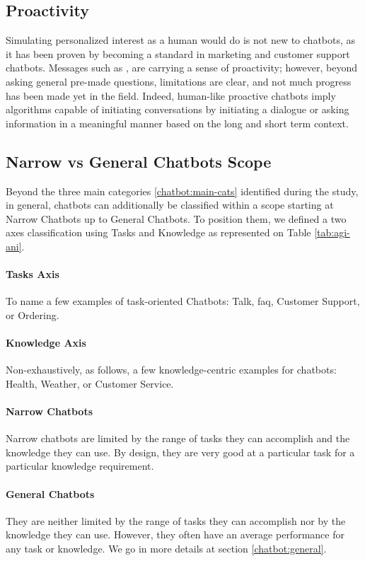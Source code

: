 \subsection{Proactivity}
Simulating personalized interest as a human would do is not new to chatbots, as it has been proven by becoming a standard in marketing and customer support chatbots. Messages such as , are carrying a sense of proactivity; however, beyond asking general pre-made questions, limitations are clear, and not much progress has been made yet in the field. Indeed, human-like proactive chatbots imply algorithms capable of initiating conversations by initiating a dialogue or asking information in a meaningful manner based on the long and short term context.

\subsection{Narrow vs General Chatbots Scope}
Beyond the three main categories \ref{chatbot:main-cats} identified during the study, in general, chatbots can additionally be classified within a scope starting at Narrow Chatbots up to General Chatbots. To position them, we defined a two axes classification using Tasks and Knowledge as represented on Table \ref{tab:agi-ani}.

\paragraph{Tasks Axis}
To name a few examples of task-oriented Chatbots: Talk, \gls{faq}, Customer Support, or Ordering.

\paragraph{Knowledge Axis}
Non-exhaustively, as follows, a few knowledge-centric examples for chatbots: Health, Weather, or Customer Service.

\paragraph{Narrow Chatbots}
Narrow chatbots are limited by the range of tasks they can accomplish and the knowledge they can use. By design, they are very good at a particular task for a particular knowledge requirement.

\paragraph{General Chatbots}
They are neither limited by the range of tasks they can accomplish nor by the knowledge they can use. However, they often have an average performance for any task or knowledge. We go in more details at section \ref{chatbot:general}.


